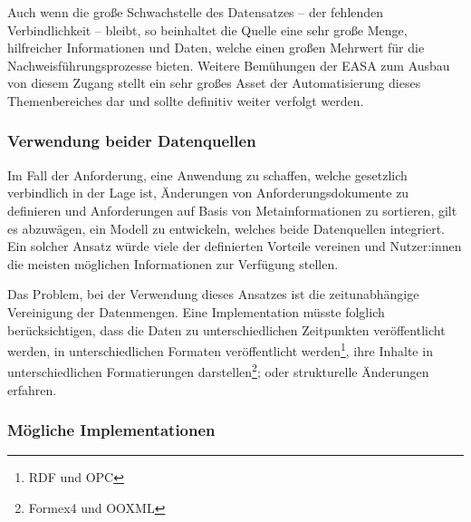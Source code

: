     \medskip
    Auch wenn die große Schwachstelle des Datensatzes -- der fehlenden Verbindlichkeit -- bleibt, so beinhaltet die Quelle eine sehr große Menge, hilfreicher Informationen und Daten, welche einen großen Mehrwert für die Nachweisführungsprozesse bieten.
    Weitere Bemühungen der \ac{EASA} zum Ausbau von diesem Zugang stellt ein sehr großes Asset der Automatisierung dieses Themenbereiches dar und sollte definitiv weiter verfolgt werden.       
    
\subsubsection{Verwendung beider Datenquellen}

    Im Fall der Anforderung, eine Anwendung zu schaffen, welche gesetzlich verbindlich in der Lage ist, Änderungen von Anforderungsdokumente zu definieren und Anforderungen auf Basis von Metainformationen zu sortieren, gilt es abzuwägen, ein Modell zu entwickeln, welches beide Datenquellen integriert.
    Ein solcher Ansatz würde viele der definierten Vorteile vereinen und Nutzer:innen die meisten möglichen Informationen zur Verfügung stellen.
    
    \medskip
    Das Problem, bei der Verwendung dieses Ansatzes ist die zeitunabhängige Vereinigung der Datenmengen.
    Eine Implementation müsste folglich berücksichtigen, dass die Daten zu unterschiedlichen Zeitpunkten veröffentlicht werden, in unterschiedlichen Formaten veröffentlicht werden\footnote{\ac{RDF} und \ac{OPC}}, ihre Inhalte in unterschiedlichen Formatierungen darstellen\footnote{Formex4 und \ac{OOXML}}; oder strukturelle Änderungen erfahren.

\pagebreak
\subsubsection{Mögliche Implementationen}
    
